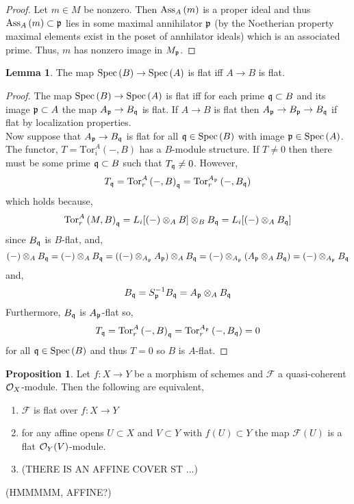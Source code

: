 \documentclass[12pt]{extarticle}
\theoremstyle{definition}
\newtheorem{lemma}[theorem]{Lemma}
\newtheorem{proposition}[theorem]{Proposition}
\newcommand{\Tor}[4]{\mathrm{Tor}^{#1}_{#2} \left( #3, #4 \right)}
\newcommand{\F}{\mathcal{F}}
\begin{document}
\begin{proof}
Let $m \in M$ be nonzero. Then $\mathrm{Ass}_{A} \left( m \right)$ is a proper ideal and thus $\mathrm{Ass}_{A} \left( m \right) \subset \mathfrak{p}$ lies in some maximal annihilator $\mathfrak{p}$ (by the Noetherian property maximal elements exist in the poset of annhilator ideals) which is an associated prime. Thus, $m$ has nonzero image in $M_{\mathfrak{p}}$.  
\end{proof}

\begin{lemma}
The map $\mathrm{Spec}\left(B\right) \to \mathrm{Spec}\left(A\right)$ is flat iff $A \to B$ is flat.
\end{lemma}

\begin{proof}
The map $\mathrm{Spec}\left(B\right) \to \mathrm{Spec}\left(A\right)$ is flat iff for each prime $\mathfrak{q} \subset B$ and its image $\mathfrak{p} \subset A$ the map $A_{\mathfrak{p}} \to B_{\mathfrak{q}}$ is flat. If $A \to B$ is flat then $A_{\mathfrak{p}} \to B_{\mathfrak{p}} \to B_{\mathfrak{q}}$ if flat by localization properties.
 \bigskip\\
Now suppose that $A_{\mathfrak{p}} \to B_{\mathfrak{q}}$ is flat for all $\mathfrak{q} \in \mathrm{Spec}\left(B\right)$ with image $\mathfrak{p} \in \mathrm{Spec}\left(A\right)$. 
The functor, $T = \Tor{A}{i}{-}{B}$ has a $B$-module structure. If $T \neq 0$ then there must be some prime $\mathfrak{q} \subset B$ such that $T_{\mathfrak{q}} \neq 0$. However,
\[ T_\q = \Tor{A}{r}{-}{B}_\q = \Tor{A_\p}{r}{-}{B_\q} \]
which holds because,
\[ \Tor{A}{r}{M}{B}_\q = L_i [(-) \otimes_ A B] \otimes_B B_\q = L_i [ (-) \otimes_A B_\q ] \]
since $B_{\mathfrak{q}}$ is $B$-flat, and,
\[ (-) \otimes_A B_{\mathfrak{q}} = (-) \otimes_A B_{\mathfrak{q}} = ((-) \otimes_{A_{\mathfrak{p}}} A_{\mathfrak{p}}) \otimes_A B_{\mathfrak{q}} = (-) \otimes_{A_{\mathfrak{p}}} (A_{\mathfrak{p}} \otimes_A B_{\mathfrak{q}}) = (-) \otimes_{A_{\mathfrak{p}}} B_{\mathfrak{q}} \]
and,
\[ B_{\mathfrak{q}} = S^{-1}_{\mathfrak{p}} B_{\mathfrak{q}} = A_{\mathfrak{p}} \otimes_A B_{\mathfrak{q}} \]
Furthermore, $B_{\mathfrak{q}}$ is $A_{\mathfrak{p}}$-flat so,
\[ T_\q = \Tor{A}{r}{-}{B}_\q = \Tor{A_\p}{r}{-}{B_\q} = 0 \]
for all $\mathfrak{q} \in \mathrm{Spec}\left(B\right)$ and thus $T = 0$ so $B$ is $A$-flat. 
\end{proof}

\begin{proposition}
Let $f : X \to Y$ be a morphism of schemes and $\F$ a quasi-coherent $\mathcal{O}_{X}$-module. Then the following are equivalent,
\begin{enumerate}
\item $\F$ is flat over $f : X \to Y$
\item for any affine opens $U \subset X$ and $V \subset Y$ with $f(U) \subset Y$ the map $\F(U)$ is a flat $\mathcal{O}_{Y}(V)$-module. 
\item (THERE IS AN AFFINE COVER ST ...)
\end{enumerate}
(HMMMMM, AFFINE?)
\end{proposition}
\end{document}
